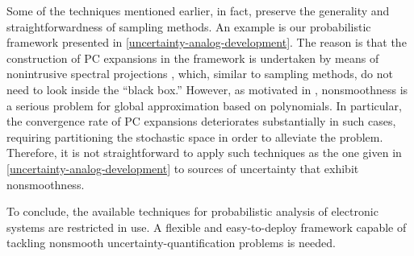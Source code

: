 Some of the techniques mentioned earlier, in fact, preserve the generality and
straightforwardness of sampling methods. An example is our probabilistic
framework presented in \cref{uncertainty-analog-development}. The reason is that
the construction of \ac{PC} expansions in the framework is undertaken by means
of nonintrusive spectral projections \cite{xiu2010}, which, similar to sampling
methods, do not need to look inside the ``black box.'' However, as motivated in
, nonsmoothness is a serious problem for global
approximation based on polynomials. In particular, the convergence rate of
\ac{PC} expansions deteriorates substantially in such cases, requiring
partitioning the stochastic space in order to alleviate the problem. Therefore,
it is not straightforward to apply such techniques as the one given in
\cref{uncertainty-analog-development} to sources of uncertainty that exhibit
nonsmoothness.

To conclude, the available techniques for probabilistic analysis of electronic
systems are restricted in use. A flexible and easy-to-deploy framework capable
of tackling nonsmooth uncertainty-quantification problems is needed.
